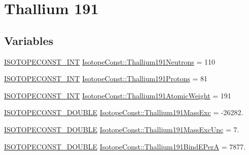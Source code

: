 \hypertarget{group___isotope_const-_thallium-_tl191}{}\section{Thallium 191}
\label{group___isotope_const-_thallium-_tl191}
\subsection*{Variables}
\begin{DoxyCompactItemize}
\item 
\mbox{\hyperlink{group___isotope_const-_macros_ga5f18360b3e99483a35c32d789e62621c}{I\+S\+O\+T\+O\+P\+E\+C\+O\+N\+S\+T\+\_\+\+I\+NT}} \mbox{\hyperlink{group___isotope_const-_thallium-_tl191_ga5b116440c29dc2a79ceaea8ba0f21f77}{Isotope\+Const\+::\+Thallium191\+Neutrons}} = 110
\item 
\mbox{\hyperlink{group___isotope_const-_macros_ga5f18360b3e99483a35c32d789e62621c}{I\+S\+O\+T\+O\+P\+E\+C\+O\+N\+S\+T\+\_\+\+I\+NT}} \mbox{\hyperlink{group___isotope_const-_thallium-_tl191_ga91b71acd4dd317a1e9c7a35c184f1c11}{Isotope\+Const\+::\+Thallium191\+Protons}} = 81
\item 
\mbox{\hyperlink{group___isotope_const-_macros_ga5f18360b3e99483a35c32d789e62621c}{I\+S\+O\+T\+O\+P\+E\+C\+O\+N\+S\+T\+\_\+\+I\+NT}} \mbox{\hyperlink{group___isotope_const-_thallium-_tl191_gab2735a9acf727875edb1574ad5c48b29}{Isotope\+Const\+::\+Thallium191\+Atomic\+Weight}} = 191
\item 
\mbox{\hyperlink{group___isotope_const-_macros_ga8f45a7272ce02c0b4c65c44636ed719a}{I\+S\+O\+T\+O\+P\+E\+C\+O\+N\+S\+T\+\_\+\+D\+O\+U\+B\+LE}} \mbox{\hyperlink{group___isotope_const-_thallium-_tl191_gad7d07fe5230c2d7dcb23c33941e902bc}{Isotope\+Const\+::\+Thallium191\+Mass\+Exc}} = -\/26282.
\item 
\mbox{\hyperlink{group___isotope_const-_macros_ga8f45a7272ce02c0b4c65c44636ed719a}{I\+S\+O\+T\+O\+P\+E\+C\+O\+N\+S\+T\+\_\+\+D\+O\+U\+B\+LE}} \mbox{\hyperlink{group___isotope_const-_thallium-_tl191_ga54c926a0c6bd13c0f5254ec934495548}{Isotope\+Const\+::\+Thallium191\+Mass\+Exc\+Unc}} = 7.
\item 
\mbox{\hyperlink{group___isotope_const-_macros_ga8f45a7272ce02c0b4c65c44636ed719a}{I\+S\+O\+T\+O\+P\+E\+C\+O\+N\+S\+T\+\_\+\+D\+O\+U\+B\+LE}} \mbox{\hyperlink{group___isotope_const-_thallium-_tl191_ga3eabe23e326b9753e7186d356db72b29}{Isotope\+Const\+::\+Thallium191\+Bind\+E\+PerA}} = 7877.
\item 

\end{DoxyCompactItemize}
